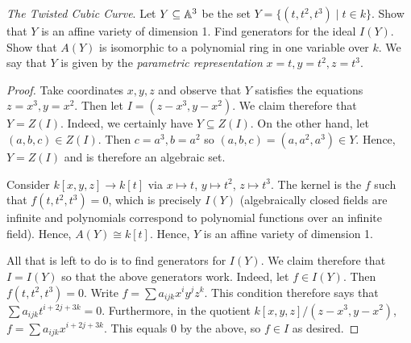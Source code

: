 \label{1.1.2}

\textit{The Twisted Cubic Curve}. Let $Y \subseteq \mathbb A^3$ be the set $Y = \{(t, t^2, t^3) \mid t \in k\}$. Show that $Y$ is an affine variety of dimension 1. Find generators for the ideal $I(Y)$. Show that $A(Y)$ is isomorphic to a polynomial ring in one variable over $k$. We say that $Y$ is given by the \textit{parametric representation} $x = t, y = t^2, z = t^3$.

\begin{proof}
    Take coordinates $x, y, z$ and observe that $Y$ satisfies the equations $z = x^3, y = x^2$. Then let $I = (z - x^3, y - x^2)$. We claim therefore that $Y = Z(I)$. Indeed, we certainly have $Y \subseteq Z(I)$. On the other hand, let $(a, b, c) \in Z(I)$. Then $c = a^3, b = a^2$ so $(a, b, c) = (a, a^2, a^3) \in Y$. Hence, $Y = Z(I)$ and is therefore an algebraic set.
    
    Consider $k[x, y, z] \longrightarrow k[t]$ via $x \mapsto t$, $y \mapsto t^2$, $z \mapsto t^3$. The kernel is the $f$ such that $f(t, t^2, t^3) = 0$, which is precisely $I(Y)$ (algebraically closed fields are infinite and polynomials correspond to polynomial functions over an infinite field). Hence, $A(Y) \cong k[t]$. Hence, $Y$ is an affine variety of dimension 1.
    
    All that is left to do is to find generators for $I(Y)$. We claim therefore that $I = I(Y)$ so that the above generators work. Indeed, let $f \in I(Y)$. Then $f(t, t^2, t^3) = 0$. Write $f = \sum a_{ijk} x^i y^j z^k$. This condition therefore says that $\sum a_{ijk} t^{i + 2j + 3k} = 0$. Furthermore, in the quotient $k[x, y, z]/(z - x^3, y - x^2)$, $f = \sum a_{ijk} x^{i + 2j + 3k}$. This equals $0$ by the above, so $f \in I$ as desired.
\end{proof}
